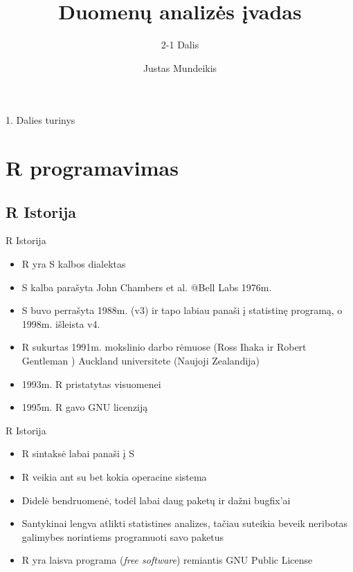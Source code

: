 \documentclass[11pt,xcolor=table]{beamer}
\author{Justas Mundeikis}
\title{Duomenų analizės įvadas}
\subtitle{2-1 Dalis}
\begin{document}

\begin{frame}
\titlepage
\end{frame}


\begin{frame}{1. Dalies turinys}
\tableofcontents
\end{frame}

\section{R programavimas}
\subsection{R Istorija}

\begin{frame}{R Istorija}
\begin{itemize}
\item R yra S kalbos dialektas
\item S kalba parašyta John Chambers et al. @Bell Labs 1976m.
\item S buvo perrašyta 1988m. (v3) ir tapo labiau panaši į statistinę programą, o 1998m. išleista v4.
\item R sukurtas 1991m. mokslinio darbo rėmuose (Ross Ihaka ir Robert Gentleman ) Auckland universitete (Naujoji Zealandija)
\item 1993m. R pristatytas visuomenei
\item 1995m. R gavo GNU licenziją
\end{itemize}
\end{frame}


\begin{frame}{R Istorija}
\begin{itemize}
\item R sintaksė labai panaši į S 
\item R veikia ant su bet kokia operacine sistema
\item Didelė bendruomenė, todėl labai daug paketų ir dažni bugfix'ai
\item Santykinai lengva atlikti statistines analizes, tačiau suteikia beveik neribotas galimybes norintiems programuoti savo paketus
\item R yra laisva programa (\textit{free software}) remiantis GNU Public License
\end{itemize}
\end{frame}
\end{document}

